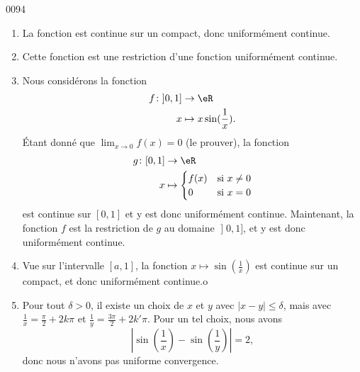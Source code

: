 
\begin{corrige}{0094}

\begin{enumerate}

\item
La fonction est continue sur un compact, donc uniformément continue.

\item
Cette fonction est une restriction d'une fonction uniformément continue.

\item
Nous considérons la fonction
\begin{equation}
	\begin{aligned}
		f\colon \mathopen]0,1\mathclose]&\to  \eR \\
		x&\mapsto x\sin(\frac{1}{ x }). 
	\end{aligned}
\end{equation}
Étant donné que $\lim_{x\to 0}f(x)=0$ (le prouver), la fonction
\begin{equation}
	\begin{aligned}
		g\colon \mathopen[0,1\mathclose]&\to  \eR \\
		x&\mapsto 
		\begin{cases}
			f(x) 	&	\text{si $x\neq 0$}\\
			0	&	 \text{si $x=0$}
\end{cases}
	\end{aligned}
\end{equation}
est continue sur $[0,1]$ et y est donc uniformément continue. Maintenant, la fonction $f$ est la restriction de $g$ au domaine $\mathopen]0,1\mathclose]$, et y est donc uniformément continue.


\item
Vue sur l'intervalle $[a,1]$, la fonction $x\mapsto\sin(\frac{1}{ x })$ est continue sur un compact, et donc uniformément continue.o

\item
Pour tout $\delta>0$, il existe un choix de $x$ et $y$ avec $| x-y |\leq\delta$, mais avec $\frac{1}{ x }=\frac{ \pi }{ 2 }+2k\pi$ et $\frac{1}{ y }=\frac{ 3\pi }{2}+2k'\pi$. Pour un tel choix, nous avons
\begin{equation}
	\left| \sin(\frac{1}{ x })-\sin(\frac{1}{ y }) \right| =2,
\end{equation}
donc nous n'avons pas uniforme convergence.


\end{enumerate}
\end{corrige}
